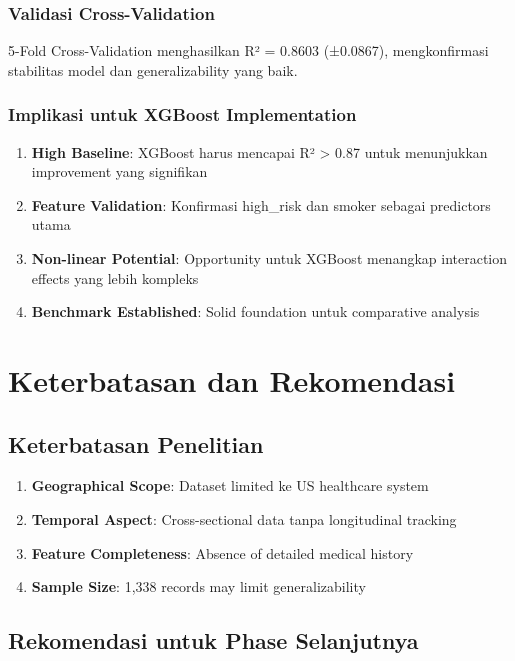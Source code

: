 \subsubsection{Validasi Cross-Validation}
5-Fold Cross-Validation menghasilkan R² = 0.8603 (±0.0867), mengkonfirmasi stabilitas model dan generalizability yang baik.

\subsubsection{Implikasi untuk XGBoost Implementation}
\begin{enumerate}
    \item \textbf{High Baseline}: XGBoost harus mencapai R² > 0.87 untuk menunjukkan improvement yang signifikan
    \item \textbf{Feature Validation}: Konfirmasi high\_risk dan smoker sebagai predictors utama
    \item \textbf{Non-linear Potential}: Opportunity untuk XGBoost menangkap interaction effects yang lebih kompleks
    \item \textbf{Benchmark Established}: Solid foundation untuk comparative analysis
\end{enumerate}

\section{Keterbatasan dan Rekomendasi}
\label{sec:keterbatasan}

\subsection{Keterbatasan Penelitian}
\label{subsec:keterbatasan}

\begin{enumerate}
    \item \textbf{Geographical Scope}: Dataset limited ke US healthcare system
    \item \textbf{Temporal Aspect}: Cross-sectional data tanpa longitudinal tracking
    \item \textbf{Feature Completeness}: Absence of detailed medical history
    \item \textbf{Sample Size}: 1,338 records may limit generalizability
\end{enumerate}

\subsection{Rekomendasi untuk Phase Selanjutnya}
\label{subsec:rekomendasi}

